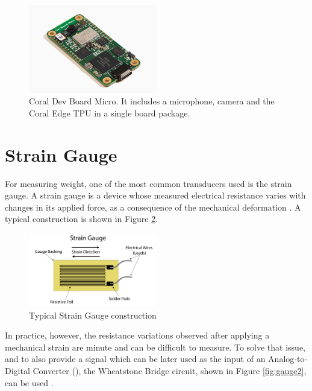 \documentclass[openright]{normas-utf-tex} %
\begin{document}
\begin{figure}[H]
	\centering
	\includegraphics[width=0.5\textwidth]{./images/coralboard.png}
	\caption[Coral Dev Board Micro]{Coral Dev Board Micro. It includes a microphone, camera and the Coral Edge TPU in a single board package.}
    \label{fig:coraldev}
\end{figure}

\section{Strain Gauge}

For measuring weight, one of the most common transducers used is the strain
gauge. A strain gauge is a device whose measured electrical resistance varies
with changes in its applied force, as a consequence of the mechanical
deformation \cite{Stefanescu}. A typical construction is shown in Figure 
\ref{fig:gauge1}.

\begin{figure}[H]
	\centering
	\includegraphics[width=0.5\textwidth]{./images/straingauge.png}
	\caption[Typical Strain Gauge construction]{Typical Strain Gauge construction}
	\label{fig:gauge1}
\end{figure}

In practice, however, the resistance variations observed after applying a
mechanical strain are minute and can be difficult to measure. To solve that issue,
and to also provide a signal which can be later used as the input of an
Analog-to-Digital Converter (), the Wheatstone
Bridge circuit, shown in Figure \ref{fig:gauge2}, can be used \cite{Michigan2020}.
\end{document}
